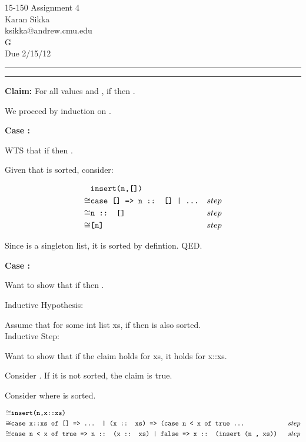 \documentclass[11pt,letterpaper]{article}
\makeatletter
\newcommand{\question}[2] {\vspace{.25in} \hrule\vspace{0.5em}
\noindent{\bf #1: #2} \vspace{0.5em}
\hrule \vspace{.10in}}
\newcommand{\myname}{Karan Sikka}
\newcommand{\myandrew}{ksikka@andrew.cmu.edu}
\newcommand{\myhwnum}{4}
\makeatother
\begin{document}
\medskip

\thispagestyle{plain}
\begin{center}                  %
{\Large 15-150 Assignment \myhwnum} \\
\myname \\
\myandrew \\
G \\
Due 2/15/12 \\
\end{center}


\question{1}{Task 3.1}

{\bf Claim:} For all values  and ,
 if  then .

We proceed by induction on .

{\bf Case \sml{[]}:}

WTS that if  then .

Given that \sml{[]} is sorted, consider:

\begin{align*}
  & \texttt{insert(n,[])} && \\
  \cong & \texttt{case [] => n :: [] | ...} && step\\
  \cong & \texttt{n :: []} && step \\
  \cong & \texttt{[n]} && step \\
\end{align*}

Since \sml{[n]} is a singleton list, it is sorted by defintion. QED.

{\bf Case :}

Want to show that if  then .

Inductive Hypothesis:

Assume that for some int list xs, if  then  is also sorted.\\

Inductive Step:

Want to show that if the claim holds for xs, it holds for x::xs.

Consider . If it is not sorted, the claim is true.

Consider  where  is sorted.

\begin{align*}
\cong & \texttt{insert(n,x::xs)} && \\
\cong & \texttt{case x::xs of [] => ... | (x :: xs) => (case n < x of true ... } && step \\
\cong & \texttt{case n < x of true => n :: (x :: xs) | false => x :: (insert (n , xs)) } && step \\
\end{align*}
\end{document}

